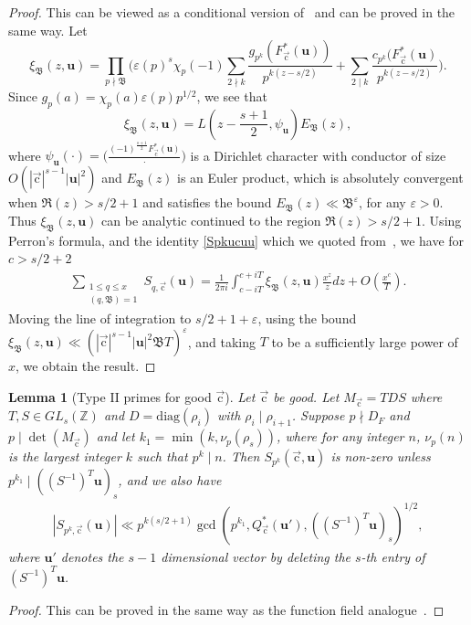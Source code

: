 \documentclass[letterpaper,11pt]{amsart}
\numberwithin{equation}{section}
\newtheorem{lemma}[theorem]{Lemma}
\theoremstyle{definition}
\numberwithin{equation}{section}
\newcommand{\ZZ}{\mathbb{Z}}
\newcommand{\uu}{\mathbf{u}}
\newcommand{\uc}{{\vec{\mathrm{c}}}}
\def\diag{{\mathrm{diag}}}
\begin{document}
\begin{proof}
This can be viewed as a conditional version of~\cite[Lemma 18]{BM} and can be proved in the same way. Let $$\xi_{\mathfrak B}(z, \uu)=\prod_{p\nmid \mathfrak B}\Big(\varepsilon(p)^s\chi_p(-1)\sum_{2\nmid k}\frac{g_{p^k}(F_\uc^*(\uu))}{p^{k(z-s/2)}}+\sum_{2\mid k}\frac{c_{p^k}(F_{\uc}^*(\uu)}{p^{k(z-s/2)}}\Big).$$
Since $g_p(a)=\chi_p(a)\varepsilon(p)p^{1/2}$, we see that 
$$\xi_{\mathfrak B}(z, \uu)=L(z-\frac{s+1}{2}, \psi_{\uu})E_{\mathfrak B}(z),$$
where $\psi_{\uu}(\cdot)=\Big(\frac{(-1)^{\frac{s+1}{2}}F_{\uc}^*(\uu)}{\cdot}\Big)$ is a Dirichlet character with conductor of size $O(|\uc|^{s-1}|\uu|^2)$ and $E_{\mathfrak B}(z)$ is an Euler product, which is absolutely convergent when $\Re(z)>s/2+1$ and satisfies the bound $E_{\mathfrak B}(z)\ll {\mathfrak B}^\varepsilon$, for any $\varepsilon>0$. Thus $\xi_{\mathfrak B}(z, \uu)$ can be analytic continued to the region $\Re(z)> s/2+1$. Using Perron's formula, and the identity \eqref{Spkucuu} which we quoted from~\cite[Lemma 15]{BM}, we have for $c>s/2+2$
\begin{align*}
\sum_{\substack{1\leq q\leq x\\ (q, \mathfrak B)=1}}S_{q,\uc}(\uu)=\frac{1}{2\pi i} \int_{c-iT}^{c+iT} \xi_{\mathfrak B}(z, \uu)\frac{x^z}{z}dz+O(\frac{x^c}{T}).
\end{align*}
Moving the line of integration to $s/2+1+\varepsilon$, using the bound $\xi_{\mathfrak B}(z, \uu)\ll (|\uc|^{s-1}|\uu|^2\mathfrak B T)^\varepsilon$, and taking $T$ to be a sufficiently large power of $x$, we obtain the result. 
\end{proof}

\begin{lemma}[Type II primes for good $\uc$]\label{lem:type II}Let $\uc$ be good. Let $M_{\uc}=TDS$ where $T, S\in GL_s(\ZZ)$ and $D=\diag(\rho_i)$ with $\rho_i\mid \rho_{i+1}$.
	Suppose $p\nmid D_F$ and $p\mid \det(M_{\uc})$ and let $k_1=\min(k, \nu_p(\rho_s))$, where for any integer $n$, $\nu_p(n)$ is the largest integer $k$ such that $p^k\mid n$. Then
	$S_{p^k}(\uc, \uu)$
	is non-zero unless $p^{k_1}\mid ((S^{-1})^T\uu)_s$, and we also have
	\begin{align*}
	|S_{p^k,\uc}( \uu)|\ll p^{k(s/2+1)}\gcd(p^{k_1},Q_{\uc}^*(\uu') ,((S^{-1})^T\uu)_s)^{1/2},
	\end{align*}
	where $\uu'$ denotes the $s-1$ dimensional vector by deleting the $s$-th entry of $(S^{-1})^T\uu$.
\end{lemma}
\begin{proof}
This can be proved in the same way as the function field analogue~\cite[Lemma 6.3]{V19}.
\end{proof}
\end{document}
